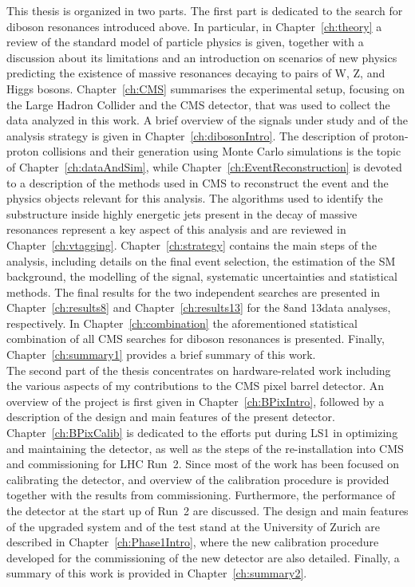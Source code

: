 This thesis is organized in two parts. The first part is dedicated to the search for diboson resonances introduced above. 
In particular, in Chapter~\ref{ch:theory} a review of the standard model of particle physics is given, together with a discussion about its limitations and an introduction on scenarios of new physics predicting the existence of massive resonances decaying to pairs of W, Z, and Higgs bosons.
Chapter~\ref{ch:CMS} summarises the experimental setup, focusing on the Large Hadron Collider and the CMS detector, that was used to collect the data analyzed in this work.
A brief overview of the signals under study and of the analysis strategy is given in Chapter~\ref{ch:dibosonIntro}.
The description of proton-proton collisions and their generation using Monte Carlo simulations is the topic of Chapter~\ref{ch:dataAndSim}, while Chapter~\ref{ch:EventReconstruction} is devoted to a description of the methods used in CMS to reconstruct the event and the physics objects relevant for this analysis. The algorithms used to identify the substructure inside highly energetic jets present in the decay of massive resonances represent a key aspect of this analysis and are reviewed in Chapter~\ref{ch:vtagging}. Chapter~\ref{ch:strategy} contains the main steps of the analysis, including details on the final event selection, the estimation of the SM background, the modelling of the signal, systematic uncertainties and statistical methods. The final results for the two independent searches are presented in Chapter~\ref{ch:results8} and Chapter~\ref{ch:results13} for the 8\TeV and 13\TeV data analyses, respectively.
In Chapter~\ref{ch:combination} the aforementioned statistical combination of all CMS searches for diboson resonances is presented. Finally, Chapter~\ref{ch:summary1} provides a brief summary of this work.\\

The second part of the thesis concentrates on hardware-related work including the various aspects of my contributions to the CMS pixel barrel detector.
An overview of the project is first given in Chapter~\ref{ch:BPixIntro}, followed by a description of the design and main features of the present detector.
Chapter~\ref{ch:BPixCalib} is dedicated to the efforts put during LS1 in optimizing and maintaining the detector, as well as the steps of the re-installation into CMS and commissioning for LHC Run~2. Since most of the work has been focused on calibrating the detector, and overview of the calibration procedure is provided together with the results from commissioning. Furthermore, the performance of the detector at the start up of Run~2 are discussed.
The design and main features of the upgraded system and of the test stand at the University of Zurich are described in Chapter~\ref{ch:Phase1Intro}, where the new calibration procedure developed for the commissioning of the new detector are also detailed. Finally, a summary of this work is provided in Chapter~\ref{ch:summary2}.
